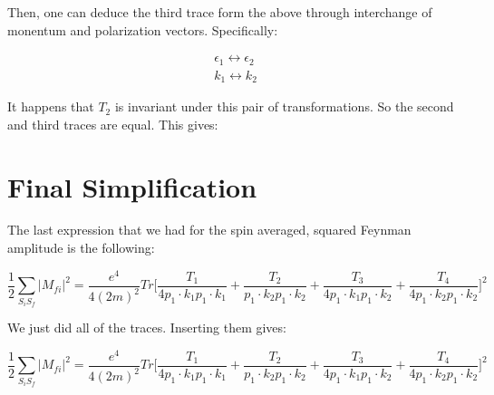 \documentclass[a4]{article}
\begin{document}
    \begin{center}
    \end{center}

    Then, one can deduce the third trace form the above through interchange of monentum and polarization vectors. Specifically:

    \begin{equation}
        \begin{aligned}
            \epsilon_1 \leftrightarrow \epsilon_2 \\
            k_1 \leftrightarrow k_2
        \end{aligned}
    \end{equation}
    
        It happens that $T_2$ is invariant under this pair of transformations. So the second and third traces are equal. This gives:

    \begin{center}
    \end{center}

    \section*{Final Simplification}

    The last expression that we had for the spin averaged, squared Feynman amplitude is the following:

    \begin{equation}
        \frac{1}{2} \sum_{S_i S_f} |M_{fi}|^2 = \frac{e^4}{4 (2m)^2} Tr \Bigg[ \frac{T_1}{4 p_1 \cdot k_1 p_1 \cdot k_1} + \frac{T_2}{p_1 \cdot k_2 p_1 \cdot k_2} + \frac{T_3}{4 p_1 \cdot k_1 p_1 \cdot k_2} + \frac{T_4}{4 p_1 \cdot k_2 p_1 \cdot k_2} \Bigg]^2
    \end{equation}

    We just did all of the traces. Inserting them gives:

    \begin{equation}
        \frac{1}{2} \sum_{S_i S_f} |M_{fi}|^2 = \frac{e^4}{4 (2m)^2} Tr \Bigg[ \frac{T_1}{4 p_1 \cdot k_1 p_1 \cdot k_1} + \frac{T_2}{p_1 \cdot k_2 p_1 \cdot k_2} + \frac{T_3}{4 p_1 \cdot k_1 p_1 \cdot k_2} + \frac{T_4}{4 p_1 \cdot k_2 p_1 \cdot k_2} \Bigg]^2
    \end{equation}
\end{document}
